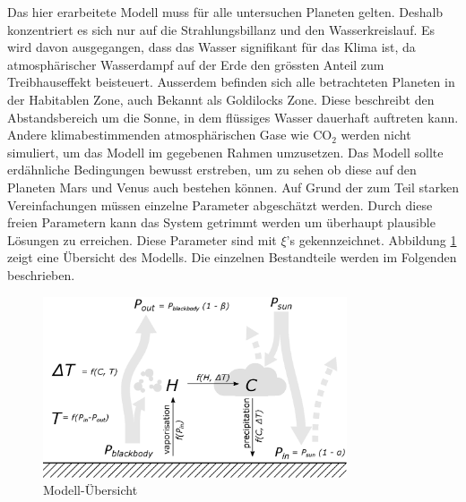 \begin{refsection}
	

	
	
	
	Das hier erarbeitete Modell muss für alle untersuchen Planeten gelten. Deshalb konzentriert es sich nur auf die Strahlungsbillanz und den Wasserkreislauf. Es wird davon ausgegangen, dass das Wasser signifikant für das Klima ist, da atmosphärischer Wasserdampf auf der Erde den grössten Anteil zum Treibhauseffekt beisteuert. Ausserdem befinden sich alle betrachteten Planeten in der Habitablen Zone, auch Bekannt als Goldilocks Zone. Diese beschreibt den Abstandsbereich um die Sonne, in dem flüssiges Wasser dauerhaft auftreten kann.
	Andere klimabestimmenden atmosphärischen Gase wie $\text{CO}_\text{2}$ werden nicht simuliert, um das Modell im gegebenen Rahmen umzusetzen.
	Das Modell sollte erdähnliche Bedingungen bewusst erstreben, um zu sehen ob diese auf den Planeten Mars und Venus auch bestehen können.
Auf Grund der zum Teil starken Vereinfachungen müssen einzelne Parameter abgeschätzt werden. Durch diese freien Parametern kann das System getrimmt werden um überhaupt plausible Lösungen zu erreichen. Diese Parameter sind mit $\xi$'s gekennzeichnet.
	Abbildung \ref{planeten_model} zeigt eine Übersicht des Modells. Die einzelnen Bestandteile werden im Folgenden beschrieben.



	

	

\begin{figure}
	\centering
	\includegraphics[width=0.8\textwidth]{planeten/Pictures/Model.eps}
	\caption{Modell-Übersicht}
	\label{planeten_model}
\end{figure}


\end{refsection}
